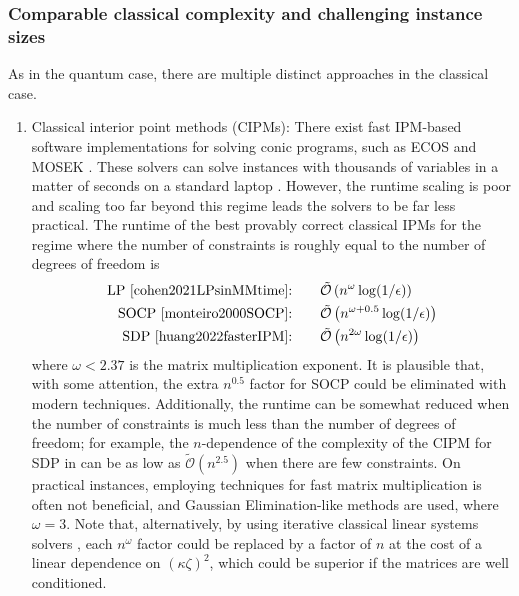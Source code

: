 \begin{refsection}
\subsubsection*{Comparable classical complexity and challenging instance sizes}
As in the quantum case, there are multiple distinct approaches in the classical case. 
\begin{enumerate}
    \item Classical interior point methods (CIPMs): There exist fast IPM-based software implementations for solving conic programs, such as ECOS \cite{domahidi2013ECOS} and MOSEK \cite{andersen2000MOSEK}. These solvers can solve instances with thousands of variables in a matter of seconds on a standard laptop \cite{domahidi2013ECOS}. However, the runtime scaling is poor and scaling too far beyond this regime leads the solvers to be far less practical. The runtime of the best provably correct classical IPMs for the regime where the number of constraints is roughly equal to the number of degrees of freedom is
    \begin{equation}
        \begin{split}
            \text{LP \cite{cohen2021LPsinMMtime}:}& \qquad \tilde{\mathcal{O}}\left(n^{\omega}\log(1/\epsilon)\right) \\
            \text{SOCP \cite{monteiro2000SOCP}:}& \qquad \tilde{\mathcal{O}}\left(n^{\omega+0.5}\log(1/\epsilon)\right)
            \\
            \text{SDP  \cite{huang2022fasterIPM}:}& \qquad \tilde{\mathcal{O}}\left( n^{2\omega}\log(1/\epsilon)\right)
        \end{split}
\end{equation}
    where $\omega<2.37$ is the matrix multiplication exponent. It is plausible that, with some attention, the extra $n^{0.5}$ factor for SOCP could be eliminated with modern techniques. Additionally, the runtime can be somewhat reduced when the number of constraints is much less than the number of degrees of freedom; for example, the $n$-dependence of the complexity of the CIPM for SDP in \cite{jiang2020fasterIPM} can be as low as $\tilde{\mathcal{O}}(n^{2.5})$ when there are few constraints.  On practical instances, employing techniques for fast matrix multiplication is often not beneficial, and Gaussian Elimination-like methods are used, where $\omega=3$.  Note that, alternatively, by using iterative classical linear systems solvers \cite{strohmer2009kaczmarz}, each $n^{\omega}$ factor could be replaced by a factor of $n$ at the cost of a linear dependence on $(\kappa \zeta)^2$, which could be superior if the matrices are well conditioned. 

\end{enumerate}
\end{refsection}
